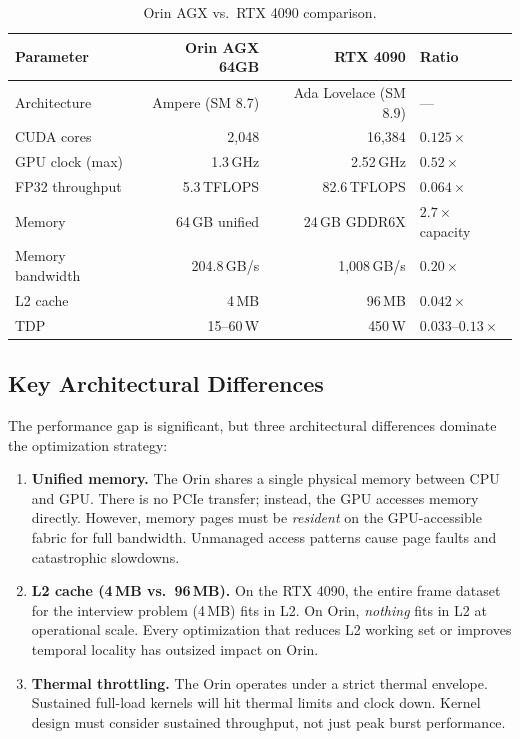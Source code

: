 \documentclass[11pt,letterpaper]{article}
\begin{document}
\begin{table}[h]
\centering
\caption{Orin AGX vs.\ RTX 4090 comparison.}
\label{tab:hw_compare}
\begin{tabular}{@{}lrrl@{}}
\toprule
\textbf{Parameter} & \textbf{Orin AGX 64GB} & \textbf{RTX 4090} & \textbf{Ratio} \\
\midrule
Architecture         & Ampere (SM 8.7)   & Ada Lovelace (SM 8.9) & --- \\
CUDA cores           & 2,048             & 16,384          & $0.125\times$ \\
GPU clock (max)      & 1.3\,GHz          & 2.52\,GHz       & $0.52\times$ \\
FP32 throughput      & 5.3\,TFLOPS       & 82.6\,TFLOPS    & $0.064\times$ \\
Memory               & 64\,GB unified    & 24\,GB GDDR6X   & $2.7\times$ capacity \\
Memory bandwidth     & 204.8\,GB/s       & 1,008\,GB/s     & $0.20\times$ \\
L2 cache             & 4\,MB             & 96\,MB          & $0.042\times$ \\
TDP                  & 15--60\,W         & 450\,W          & $0.033$--$0.13\times$ \\
\bottomrule
\end{tabular}
\end{table}

\subsection{Key Architectural Differences}

The performance gap is significant, but three architectural differences
dominate the optimization strategy:

\begin{enumerate}[leftmargin=2em]
    \item \textbf{Unified memory.} The Orin shares a single physical memory
    between CPU and GPU. There is no PCIe transfer; instead, the GPU
    accesses memory directly. However, memory pages must be \emph{resident}
    on the GPU-accessible fabric for full bandwidth. Unmanaged access
    patterns cause page faults and catastrophic slowdowns.

    \item \textbf{L2 cache (4\,MB vs.\ 96\,MB).} On the RTX 4090, the
    entire frame dataset for the interview problem (4\,MB) fits in L2.
    On Orin, \emph{nothing} fits in L2 at operational scale. Every
    optimization that reduces L2 working set or improves temporal locality
    has outsized impact on Orin.

    \item \textbf{Thermal throttling.} The Orin operates under a strict
    thermal envelope. Sustained full-load kernels will hit thermal limits
    and clock down. Kernel design must consider sustained throughput, not
    just peak burst performance.
\end{enumerate}
\end{document}
